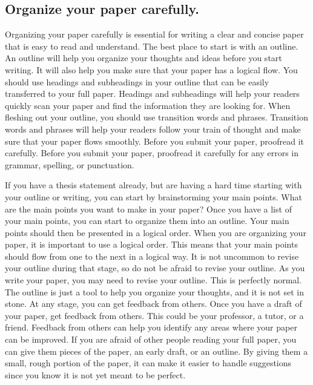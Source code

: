 \documentclass[
  b5paper]{book}
\begin{document}
\hypertarget{organize-your-paper-carefully.}{%
\subsection*{Organize your paper carefully.}\label{organize-your-paper-carefully.}}

Organizing your paper carefully is essential for writing a clear and concise paper that is easy to read and understand. The best place to start is with an outline. An outline will help you organize your thoughts and ideas before you start writing. It will also help you make sure that your paper has a logical flow. You should use headings and subheadings in your outline that can be easily transferred to your full paper. Headings and subheadings will help your readers quickly scan your paper and find the information they are looking for. When fleshing out your outline, you should use transition words and phrases. Transition words and phrases will help your readers follow your train of thought and make sure that your paper flows smoothly. Before you submit your paper, proofread it carefully. Before you submit your paper, proofread it carefully for any errors in grammar, spelling, or punctuation.

If you have a thesis statement already, but are having a hard time starting with your outline or writing, you can start by brainstorming your main points. What are the main points you want to make in your paper? Once you have a list of your main points, you can start to organize them into an outline. Your main points should then be presented in a logical order. When you are organizing your paper, it is important to use a logical order. This means that your main points should flow from one to the next in a logical way. It is not uncommon to revise your outline during that stage, so do not be afraid to revise your outline. As you write your paper, you may need to revise your outline. This is perfectly normal. The outline is just a tool to help you organize your thoughts, and it is not set in stone. At any stage, you can get feedback from others. Once you have a draft of your paper, get feedback from others. This could be your professor, a tutor, or a friend. Feedback from others can help you identify any areas where your paper can be improved. If you are afraid of other people reading your full paper, you can give them pieces of the paper, an early draft, or an outline. By giving them a small, rough portion of the paper, it can make it easier to handle suggestions since you know it is not yet meant to be perfect.
\end{document}
